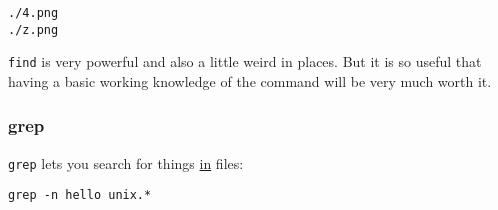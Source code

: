 \documentclass[11pt]{article}
\begin{document}
\begin{verbatim}
./4.png
./z.png
\end{verbatim}

\texttt{find} is very powerful and also a little weird in places. But it is
so useful that having a basic working knowledge of the command will be
very much worth it.

\subsubsection{grep}
\label{sec:org1f25d5e}

\texttt{grep} lets you search for things \uline{in} files:

\begin{verbatim}
grep -n hello unix.*
\end{verbatim}
\end{document}
